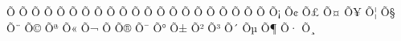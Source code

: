 ^^d5^^82{\Armghat}%
^^d5^^83{\Armtche}%
^^d5^^84{\Armmen}%
^^d5^^85{\Armhi}%
^^d5^^86{\Armnu}%
^^d5^^87{\Armsha}%
^^d5^^88{\Armvo}%
^^d5^^89{\Armcha}%
^^d5^^8a{\Armpe}%
^^d5^^8b{\Armje}%
^^d5^^8c{\Armra}%
^^d5^^8d{\Armse}%
^^d5^^8e{\Armvev}%
^^d5^^8f{\Armtyun}%
^^d5^^90{\Armre}%
^^d5^^91{\Armtso}%
^^d5^^92{\Armvyun}%
^^d5^^93{\Armpyur}%
^^d5^^94{\Armke}%
^^d5^^95{\Armo}%
^^d5^^96{\Armfe}%
%
%
^^d5^^a1{\armayb}%
^^d5^^a2{\armben}%
^^d5^^a3{\armgim}%
^^d5^^a4{\armda}%
^^d5^^a5{\armyech}%
^^d5^^a6{\armza}%
^^d5^^a7{\arme}%
^^d5^^a8{\armat}%
^^d5^^a9{\armto}%
^^d5^^aa{\armzhe}%
^^d5^^ab{\armini}%
^^d5^^ac{\armlyun}%
^^d5^^ad{\armkhe}%
^^d5^^ae{\armtsa}%
^^d5^^af{\armken}%
^^d5^^b0{\armho}%
^^d5^^b1{\armdza}%
^^d5^^b2{\armghat}%
^^d5^^b3{\armtche}%
^^d5^^b4{\armmen}%
^^d5^^b5{\armhi}%
^^d5^^b6{\armnu}%
^^d5^^b7{\armsha}%
^^d5^^b8{\armvo}%
